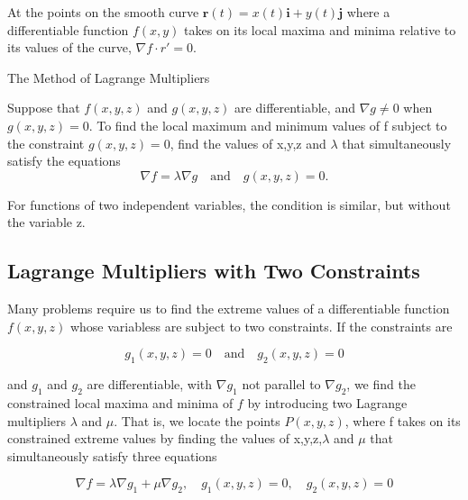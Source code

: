 \documentclass[12pt,a4paper,draft]{article}
\newenvironment{corollary}{\begin{corollarybox}}{\end{corollarybox}\vspace{1\baselineskip}}
\newenvironment{ruleBox}[1]{\begin{rulebox}{#1}}{\end{rulebox}\vspace{1\baselineskip}}
\newenvironment{mynote}{\vspace{1\baselineskip}\begin{note}}{\end{note}\vspace{1\baselineskip}}
\begin{document}
\begin{corollary}
    At the points on the smooth curve \(\mathbf{r}(t) = x(t)\mathbf{i} + y(t)\mathbf{j}\) where a differentiable function \(f(x,y)\) takes on its local maxima and minima relative to its values of the curve, \(\nabla f \cdot r' = 0\).


\end{corollary}


\begin{ruleBox}{The Method of Lagrange Multipliers}
    
    Suppose that \( f(x,y,z) \) and \( g(x,y,z) \) are differentiable, and \( \nabla g \neq 0 \) when \( g(x,y,z) = 0 \).
    To find the local maximum and minimum values of f subject to the constraint \(g(x,y,z) = 0\), find the values of x,y,z and \(\lambda\) that 
    simultaneously satisfy the equations
    \[\nabla f = \lambda \nabla g \quad \text{and} \quad g(x,y,z) = 0.\]

    For functions of two independent variables, the condition is similar, but without the variable z.

    
\end{ruleBox}



\subsection{Lagrange Multipliers with Two Constraints}

Many problems require us to find the extreme values of a differentiable function \(f(x,y,z)\) whose variabless are subject to two constraints. If the constraints are 

\[g_1(x,y,z) = 0 \quad \text{and} \quad g_2(x,y,z) = 0\]

and \(g_1\) and \(g_2\) are differentiable, with \(\nabla g_1\) not parallel to \(\nabla g_2\), we find the constrained local maxima and minima of \(f\) by introducing two Lagrange multipliers \(\lambda\) and \(\mu\).
That is, we locate the points \(P(x,y,z)\), where f takes on its constrained extreme values by finding the values of x,y,z,\(\lambda\) and \(\mu\) that simultaneously satisfy three equations


\begin{mynote}
    \[\nabla f = \lambda \nabla g_1 + \mu \nabla g_2, \quad g_1(x,y,z) = 0, \quad  g_2(x,y,z) = 0 \]
    
\end{mynote}
\end{document}
